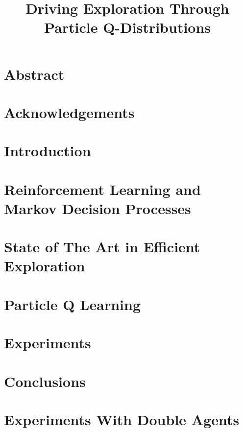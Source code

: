 \documentclass[11pt]{report}
\begin{document}
\title{
	Driving Exploration Through Particle Q-Distributions
}

\chapter*{Abstract}


\chapter*{Acknowledgements}


\tableofcontents

\listoffigures

\listofalgorithms

\chapter{Introduction}

\chapter{Reinforcement Learning and Markov Decision Processes} \label{chap:chapter2}
 
\chapter{State of The Art in Efficient Exploration} \label{chap:chapter3}
 
\chapter{Particle Q Learning} \label{chap:chapter4}
 
\chapter{Experiments}		\label{chap:chapter5}
 
\chapter{Conclusions}		\label{chap:chapter6}
 


\appendix
\chapter{Experiments With Double Agents}
\label{app:appendixA}
\end{document}
